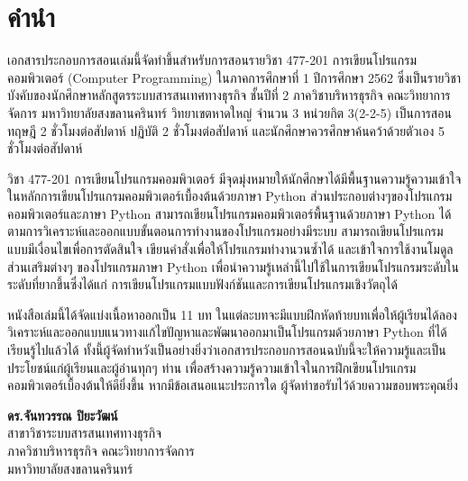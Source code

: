 \chapter{คำนำ}

เอกสารประกอบการสอนเล่มนี้จัดทำขึ้นสำหรับการสอนรายวิชา 477-201 การเขียนโปรแกรมคอมพิวเตอร์ (Computer Programming) ในภาคการศึกษาที่ 1 ปีการศึกษา 2562 ซึ่งเป็นรายวิชาบังคับของนักศึกษาหลักสูตรระบบสารสนเทศทางธุรกิจ ชั้นปีที่ 2 ภาควิชาบริหารธุรกิจ คณะวิทยาการจัดการ มหาวิทยาลัยสงขลานครินทร์ วิทยาเขตหาดใหญ่ จำนวน 3 หน่วยกิต 3(2-2-5) เป็นการสอนทฤษฎี 2 ชั่วโมงต่อสัปดาห์ ปฏิบัติ 2 ชั่วโมงต่อสัปดาห์ และนักศึกษาควรศึกษาค้นคว้าด้วยตัวเอง 5 ชั่วโมงต่อสัปดาห์

วิชา 477-201 การเขียนโปรแกรมคอมพิวเตอร์ มีจุดมุ่งหมายให้นักศึกษาได้มีพื้นฐานความรู้ความเข้าใจในหลักการเขียนโปรแกรมคอมพิวเตอร์เบื้องต้นด้วยภาษา Python ส่วนประกอบต่างๆของโปรแกรมคอมพิวเตอร์และภาษา Python สามารถเขียนโปรแกรมคอมพิวเตอร์พื้นฐานด้วยภาษา Python ได้ตามการวิเคราะห์และออกแบบขั้นตอนการทำงานของโปรแกรมอย่างมีระบบ สามารถเขียนโปรแกรมแบบมีเงื่อนไขเพื่อการตัดสินใจ เขียนคำสั่งเพื่อให้โปรแกรมทำงานวนซ้ำได้ และเข้าใจการใช้งานโมดูลส่วนเสริมต่างๆ ของโปรแกรมภาษา Python เพื่อนำความรู้เหล่านี้ไปใช้ในการเขียนโปรแกรมระดับในระดับที่ยากขึ้นซึ่งได้แก่ การเขียนโปรแกรมแบบฟังก์ชันและการเขียนโปรแกรมเชิงวัตถุได้

หนังสือเล่มนี้ได้จัดแบ่งเนื้อหาออกเป็น 11 บท ในแต่ละบทจะมีแบบฝึกหัดท้ายบทเพื่อให้ผู้เรียนได้ลองวิเคราะห์และออกแบบแนวทางแก้ไขปัญหาและพัฒนาออกมาเป็นโปรแกรมด้วยภาษา Python ที่ได้เรียนรู้ไปแล้วได้ ทั้งนี้ผู้จัดทำหวังเป็นอย่างยิ่งว่าเอกสารประกอบการสอนฉบับนี้จะให้ความรู้และเป็นประโยชน์แก่ผู้เรียนและผู้อ่านทุกๆ ท่าน เพื่อสร้างความรู้ความเข้าใจในการฝึกเขียนโปรแกรมคอมพิวเตอร์เบื้องต้นให้ดียิ่งขึ้น หากมีข้อเสนอแนะประการใด ผู้จัดทำขอรับไว้ด้วยความขอบพระคุณยิ่ง

\vspace{10mm}
\noindent
\textbf{ดร.จันทวรรณ ปิยะวัฒน์}\\
สาขาวิชาระบบสารสนเทศทางธุรกิจ\\
ภาควิชาบริหารธุรกิจ คณะวิทยาการจัดการ\\
มหาวิทยาลัยสงขลานครินทร์